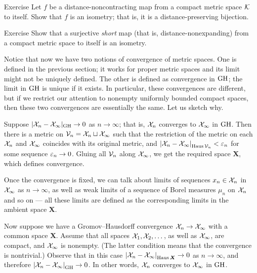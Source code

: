 \begin{thm}{Exercise}\label{ex:non-contracting-map}
Let $f$ be a distance-noncontracting map from a compact metric space $\mathcal{K}$ to itself.
Show that $f$ is an isometry; that is, it is a distance-preserving bijection.
\end{thm}

\begin{thm}{Exercise}\label{ex:non-expanding-map}
Show that a surjective \emph{short} map (that is, distance-nonexpanding) from a compact metric space to itself is an isometry.
\end{thm}

Notice that now we have two notions of convergence of metric spaces.
One is defined in the previous section; it works for proper metric spaces and
its limit might not be uniquely defined.
The other is defined as convergence in $\operatorname{\rm GH}\nolimits$;
the limit in $\operatorname{\rm GH}\nolimits$ is unique if it exists.
In particular, these convergences are different, but if we restrict our attention to nonempty uniformly bounded compact spaces, then these two convergences are essentially the same.
Let us sketch why.

Suppose $|\mathcal{X}_n-\mathcal{X}_\infty|_{\operatorname{\rm GH}\nolimits}\to 0$ as $n\to \infty$;
that is, $\mathcal{X}_n$ converges to $\mathcal{X}_\infty$ in $\operatorname{\rm GH}\nolimits$.
Then there is a metric on $\mathcal{V}_n=\mathcal{X}_n\sqcup \mathcal{X}_\infty$ such that the restriction of the metric on each $\mathcal{X}_n$ and $\mathcal{X}_\infty$ coincides with its original metric, and $\dist{\spc{X}_n}{\spc{X}_\infty}{\Haus\spc{V}_n}<\eps_n$ for some sequence $\varepsilon_n\to 0$.
Gluing all $\mathcal{V}_n$ along $\mathcal{X}_\infty$, we get the required space $\bm{X}$, which defines convergence.

Once the convergence is fixed, we can talk about limits of sequences $x_n\in \mathcal{X}_n$ in $\mathcal{X}_\infty$ as $n\to\infty$, as well as weak limits of a sequence of Borel measures $\mu_n$ on $\mathcal{X}_n$ and so on --- all these limits are defined as the corresponding limits in the ambient space $\bm{X}$.

Now suppose we have a Gromov--Hausdorff convergence $\mathcal{X}_n\to \mathcal{X}_\infty$ with a common space $\bm{X}$.
Assume that all spaces $\mathcal{X}_1,\mathcal{X}_2,\dots$, as well as $\mathcal{X}_\infty$, are compact, and $\mathcal{X}_\infty$ is nonempty.
(The latter condition means that the convergence is nontrivial.)
Observe that in this case $\dist{\spc{X}_n}{\spc{X}_\infty}{\Haus\bm{X}}\to 0$ as $n\to \infty$,
and therefore $\dist{\spc{X}_n}{\spc{X}_\infty}{\GH}\to 0$.
In other words, $\mathcal{X}_n$ converges to $\mathcal{X}_\infty$ in $\operatorname{\rm GH}\nolimits$.

